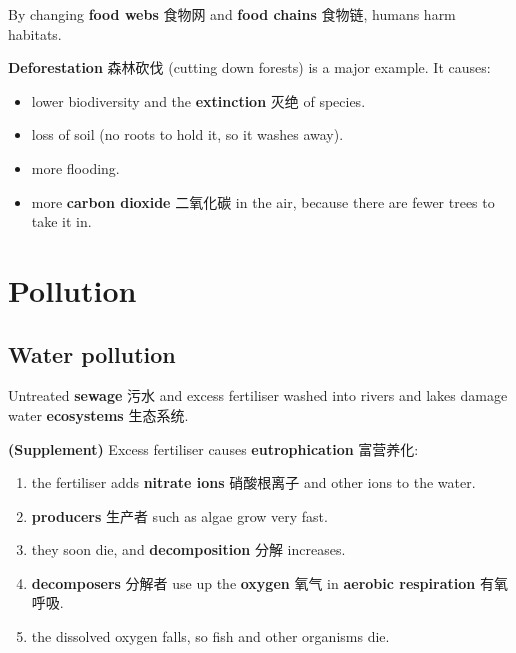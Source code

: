\documentclass[11pt]{article}
\begin{document}
By changing \textbf{food webs} 食物网 and \textbf{food chains} 食物链, humans harm habitats.

\textbf{Deforestation} 森林砍伐 (cutting down forests) is a major example. It causes:

\begin{itemize}
\item lower biodiversity and the \textbf{extinction} 灭绝 of species.

\item loss of soil (no roots to hold it, so it washes away).

\item more flooding.

\item more \textbf{carbon dioxide} 二氧化碳 in the air, because there are fewer trees to take it in.

\end{itemize}

\section*{Pollution}

\subsection*{Water pollution}

Untreated \textbf{sewage} 污水 and excess fertiliser washed into rivers and lakes damage water \textbf{ecosystems} 生态系统.

\textbf{(Supplement)} Excess fertiliser causes \textbf{eutrophication} 富营养化:

\begin{enumerate}
\item the fertiliser adds \textbf{nitrate ions} 硝酸根离子 and other ions to the water.

\item \textbf{producers} 生产者 such as algae grow very fast.

\item they soon die, and \textbf{decomposition} 分解 increases.

\item \textbf{decomposers} 分解者 use up the \textbf{oxygen} 氧气 in \textbf{aerobic respiration} 有氧呼吸.

\item the dissolved oxygen falls, so fish and other organisms die.

\end{enumerate}
\end{document}
